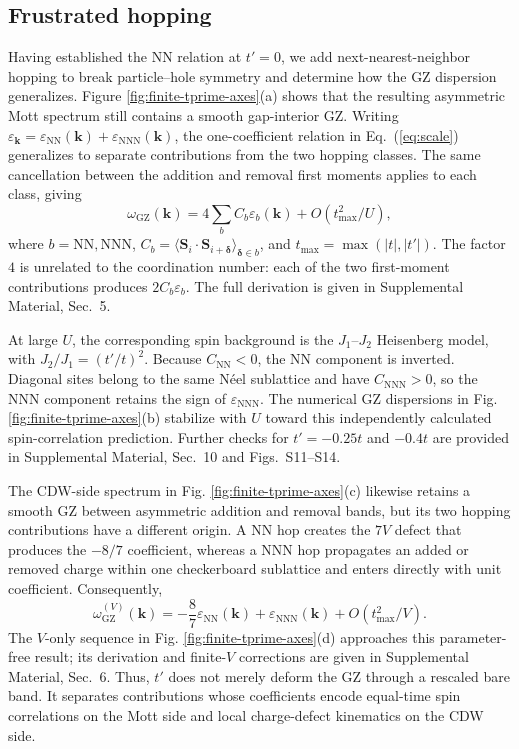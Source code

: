 \documentclass[aps,prl,reprint,superscriptaddress,nofootinbib,longbibliography]{revtex4-1}
\newcommand{\tp}{t'}
\newcommand{\wzero}{\omega_{\mathrm{GZ}}}
\newcommand{\disp}[1]{Eq.~(\ref{#1})}
\newcommand{\figdisp}[1]{Fig. \ref{#1}}
\newcommand{\Figdisp}[1]{Figure \ref{#1}}
\begin{document}
\subsection{Frustrated hopping}
Having established the NN relation at $\tp=0$, we add next-nearest-neighbor hopping to break particle--hole symmetry and determine how the GZ dispersion generalizes. \Figdisp{fig:finite-tprime-axes}(a) shows that the resulting asymmetric Mott spectrum still contains a smooth gap-interior GZ. Writing
$\varepsilon_{\mathbf k}=\varepsilon_{\mathrm{NN}}(\mathbf k)+
\varepsilon_{\mathrm{NNN}}(\mathbf k)$, the one-coefficient relation in
\disp{eq:scale} generalizes to separate contributions from the two hopping classes. The same cancellation between the addition and removal first moments applies to each class, giving
\begin{equation}
 \wzero(\mathbf k)
 =4\sum_b C_b\varepsilon_b(\mathbf k)
 +O(t_{\max}^2/U),
 \label{eq:hopping-channel-spin-limit}
\end{equation}
where $b=\mathrm{NN},\mathrm{NNN}$,
$C_b=\langle\mathbf S_i\!\cdot\!\mathbf S_{i+\boldsymbol\delta}\rangle_{\boldsymbol\delta\in b}$,
and $t_{\max}=\max(|t|,|\tp|)$. The factor $4$ is unrelated to the coordination number: each of the two first-moment contributions produces
$2C_b\varepsilon_b$. The full derivation is given in Supplemental Material, Sec.~5.

At large $U$, the corresponding spin background is the $J_1$--$J_2$ Heisenberg model, with $J_2/J_1=(\tp/t)^2$. Because
$C_{\mathrm{NN}}<0$, the NN component is inverted. Diagonal sites belong to the same N\'eel sublattice and have
$C_{\mathrm{NNN}}>0$, so the NNN component retains the sign of
$\varepsilon_{\mathrm{NNN}}$. The numerical GZ dispersions in
\figdisp{fig:finite-tprime-axes}(b) stabilize with $U$ toward this independently calculated spin-correlation prediction. Further checks for
$\tp=-0.25t$ and $-0.4t$ are provided in Supplemental Material, Sec.~10 and Figs.~S11--S14.

The CDW-side spectrum in \figdisp{fig:finite-tprime-axes}(c) likewise retains a smooth GZ between asymmetric addition and removal bands, but its two hopping contributions have a different origin.  A NN hop creates the $7V$ defect that
produces the $-8/7$ coefficient, whereas a NNN hop propagates an
added or removed charge within one checkerboard sublattice and enters directly with unit coefficient.  Consequently,
\begin{equation}
 \wzero^{(V)}(\mathbf k)=-\frac87\varepsilon_{\mathrm{NN}}(\mathbf k)
 +\varepsilon_{\mathrm{NNN}}(\mathbf k)+O(t_{\max}^2/V).
 \label{eq:hopping-channel-charge-limit}
\end{equation}
The $V$-only sequence in \figdisp{fig:finite-tprime-axes}(d) approaches this parameter-free result; its derivation and finite-$V$ corrections are given in Supplemental Material, Sec.~6.
Thus, $\tp$ does not merely deform the GZ through a rescaled bare band. It separates contributions whose coefficients encode equal-time spin correlations on the Mott side and local charge-defect kinematics on the CDW side.
\end{document}
